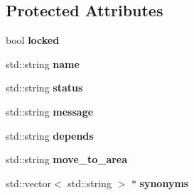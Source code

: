 \subsection*{\-Protected \-Attributes}
\begin{DoxyCompactItemize}
\item 
\hypertarget{class_area_command_a23a6e53dfc6f1d8988f41b9fc48c3048}{
bool {\bfseries locked}}
\label{class_area_command_a23a6e53dfc6f1d8988f41b9fc48c3048}

\item 
\hypertarget{class_area_command_a3295a37db88c72813df17dd9b4db060f}{
std\-::string {\bfseries name}}
\label{class_area_command_a3295a37db88c72813df17dd9b4db060f}

\item 
\hypertarget{class_area_command_a4ba177c6d8cc7f074d0642e4fd343f14}{
std\-::string {\bfseries status}}
\label{class_area_command_a4ba177c6d8cc7f074d0642e4fd343f14}

\item 
\hypertarget{class_area_command_af98d35c3cc1789af861eb8c2511a3d2a}{
std\-::string {\bfseries message}}
\label{class_area_command_af98d35c3cc1789af861eb8c2511a3d2a}

\item 
\hypertarget{class_area_command_afab48cca59ca37d72e39f24a17fb7c0c}{
std\-::string {\bfseries depends}}
\label{class_area_command_afab48cca59ca37d72e39f24a17fb7c0c}

\item 
\hypertarget{class_area_command_a5ade0f6aabc1891270b1538a3e028f2f}{
std\-::string {\bfseries move\-\_\-to\-\_\-area}}
\label{class_area_command_a5ade0f6aabc1891270b1538a3e028f2f}

\item 
\hypertarget{class_area_command_a2d89a68dd223fefde961b443caec9153}{
std\-::vector$<$ std\-::string $>$ $\ast$ {\bfseries synonyms}}
\label{class_area_command_a2d89a68dd223fefde961b443caec9153}

\end{DoxyCompactItemize}


